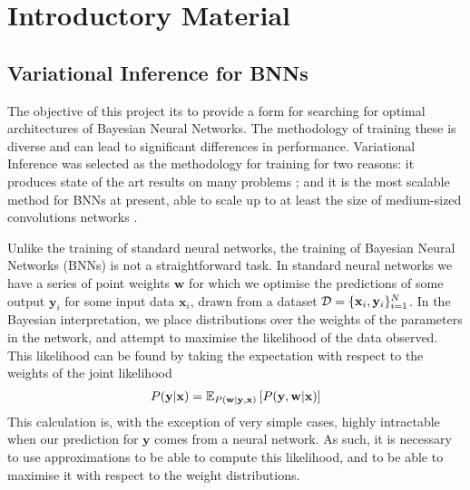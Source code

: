
\chapter{Introductory Material}

\ifpdf
    \graphicspath{{Chapter2/Figs/Raster/}{Chapter2/Figs/PDF/}{Chapter2/Figs/}}
\else
    \graphicspath{{Chapter2/Figs/Vector/}{Chapter2/Figs/}}
\fi

\section{Variational Inference for BNNs}

The objective of this project its to provide a form for searching for optimal architectures of Bayesian Neural Networks. The methodology of training these is diverse and can lead to significant differences in performance. Variational Inference was selected as the methodology for training for two reasons: it produces state of the art results on many problems \citep{bui2016deep}; and it is the most scalable method for BNNs at present, able to scale up to at least the size of medium-sized convolutions networks \citep{Shridhar2018}.

Unlike the training of standard neural networks, the training of Bayesian Neural Networks (BNNs) is not a straightforward task. In standard neural networks we have a series of point weights \( \mathbf{w} \) for which we optimise the predictions of some output \( \mathbf{y}_i \) for some input data \( \mathbf{x}_i \), drawn from a dataset \( \mathcal{D} = \{\mathbf{x}_i, \mathbf{y}_i\}_{i=1}^N \). In the Bayesian interpretation, we place distributions over the weights of the parameters in the network, and attempt to maximise the likelihood of the data observed. This likelihood can be found by taking the expectation with respect to the weights of the joint likelihood
\begin{align}
	P(\mathbf{y} | \mathbf{x}) = \mathbb{E}_{P(\mathbf{w} | \mathbf{y}, \mathbf{x})} \left[ P(\mathbf{y}, \mathbf{w} |  \mathbf{x}) \right]
\end{align} 
This calculation is, with the exception of very simple cases, highly intractable when our prediction for \( \mathbf{y} \) comes from a neural network. As such, it is necessary to use approximations to be able to compute this likelihood, and to be able to maximise it with respect to the weight distributions.

